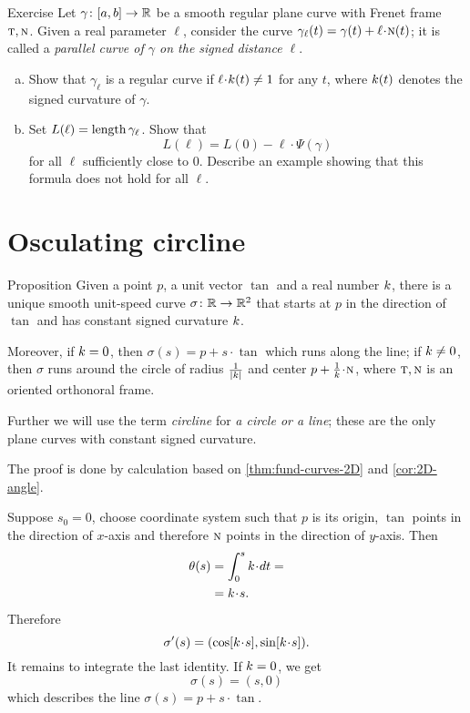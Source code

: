 \begin{thm}{Exercise}\label{ex:length'}
Let $\gamma\colon[a,b]\to\mathbb{R}$ be a smooth regular plane curve with Frenet frame $\textsc{t},\textsc{n}$.
Given a real parameter $\ell$, consider
the curve $\gamma_\ell(t)=\gamma(t)+\ell\cdot\norm(t)$; it is called a \emph{parallel curve of $\gamma$ on the signed distance $\ell$}.

\begin{enumerate}[(a)]
\item Show that $\gamma_\ell$ is a regular curve if $\ell\cdot \skur(t)\ne 1$ for any $t$, where $k(t)$ denotes the signed curvature of $\gamma$. 
\item Set $L(\ell)=\mathop{\rm length}\nolimits\gamma_\ell$.
Show that 
\[L(\ell)=L(0)-\ell\cdot\Psi(\gamma)\]
for all $\ell$ sufficiently close to $0$. 
Describe an example showing that this formula does not hold for all $\ell$. 
\end{enumerate}

\end{thm}


\section*{Osculating circline}

\begin{thm}{Proposition}\label{prop:circline}
Given a point $p$,
a unit vector $\tan$ 
and a real number $k$, there is a unique smooth unit-speed curve $\sigma\colon\mathbb{R}\to\mathbb{R}^2$ 
that starts at $p$ in the direction of $\tan$ and has constant signed curvature $k$.

Moreover, if $k=0$, then $\sigma(s)=p+s\cdot \tan$ which runs along the line;
if $k\ne 0$, then $\sigma$ runs around the circle of radius $\tfrac1{|k|}$ and center $p+\tfrac1\skur\cdot \norm$, where $\textsc{t},\textsc{n}$ is an oriented orthonoral frame.
\end{thm}

Further we will use the term \emph{circline} for \emph{a circle or a line};
these are the only plane curves with constant signed curvature.

The proof is done by calculation based on \ref{thm:fund-curves-2D} and \ref{cor:2D-angle}.

Suppose $s_0=0$, choose coordinate system such that $p$ is its origin, $\tan$ points in the direction of $x$-axis and therefore $\textsc{n}$ points in the direction of $y$-axis.
Then
\begin{align*}\theta(s)&=\int_{0}^s\skur\cdot dt=
\\
&=\skur\cdot s.
\end{align*}
Therefore
\[\sigma'(s)=(\cos[\skur\cdot s],\sin[\skur\cdot s]).\]
It remains to integrate the last identity.
If $k=0$, we get 
\[\sigma(s)=(s,0)\]
which describes the line $\sigma(s)=p+s\cdot \tan$.

